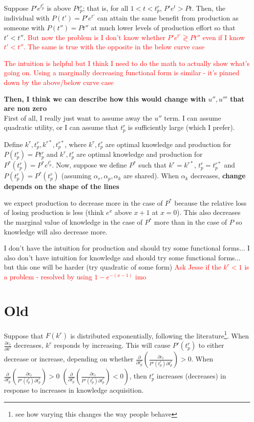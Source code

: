 \documentclass[source/paper/main.tex]{subfiles}
\begin{document}
Suppose $P' e^{t_p^r}$ is above $P t_p^r$; that is, for all $1<t < t_p^r$, $P' e^t > Pt$. Then, the individual with $P(t') = P' e^{t'}$ can attain the same benefit from production as someone with $P(t'') = P t''$ at much lower levels of production effort so that $t' < t''$. \textcolor{red}{But now the problem is I don't know whether $P' e^{t'} \gtrless P t''$ even if I know $t' < t''$. The same is true with the opposite in the below curve case}

\textcolor{red}{The intuition is helpful but I think I need to do the math to actually show what's going on. Using a marginally decreasing functional form is similar - it's pinned down by the above/below curve case}




\textbf{Then, I think we can describe how this would change with $u'', u'''$ that are non zero}\\
First of all, I really just want to assume away the $u''$ term. I can assume quadratic utility, or I can assume that $t_p^r$ is sufficiently large (which I prefer). 


Define $k^r, t_p^r, k^{r*}, t_p^{r*}$, where $k^r, t_p^r$ are optimal knowledge and production for $P(t_p^r) = P t_p^r$ and $k^r, t_p^r$ are optimal knowledge and production for $P^*(t_p^r) = P^* e^{t_p^r}$. Now, suppose we define $P^*$ such that $k^r = k^{r*}$,  $t_p^r = t_p^{r*}$ and $P(t_p^r) = P^*(t_p^r)$ (assuming $\alpha_r, \alpha_p, \alpha_k$ are shared). When $\alpha_k$ decreases, \textbf{change depends on the shape of the lines }


we expect production to decrease more in the case of $P^*$ because the relative loss of losing production is less (think $e^x$ above $x+1$ at $x=0$). This also decreases the marginal value of knowledge in the case of $P^*$ more than in the case of $P$ so knowledge will also decrease more. 


{I don't have the intuition for production and should try some functional forms... I also don't have intuition for knowledge and should try some functional forms... but this one will be harder (try quadratic of some form)}
\textcolor{red}{Ask Jesse if the $k^r<1$ is a problem - resolved by using $1-e^{-(x-1)}$ imo}

\section{Old}

Suppose that $F(k^r)$ is distributed exponentially, following the literature\footnote{see how varying this changes the way people behave}. When $\frac{\partial c_r}{\partial k^r}$ decreases,  $k^r$ responds by increasing. This will cause $P'(t_p^r)$ to either decrease or increase, depending on whether $\frac{\partial }{\partial t_p^r}(\frac{\partial c_r}{P'(t_p^r)\partial t_p^r})>0$. When $\frac{\partial }{\partial t_p^r}(\frac{\partial c_r}{P'(t_p^r)\partial t_p^r})>0$ $(\frac{\partial }{\partial t_p^r}(\frac{\partial c_r}{P'(t_p^r)\partial t_p^r})<0)$, then $t_p^r$ increases (decreases) in response to increases in knowledge acquisition. 
\end{document}
